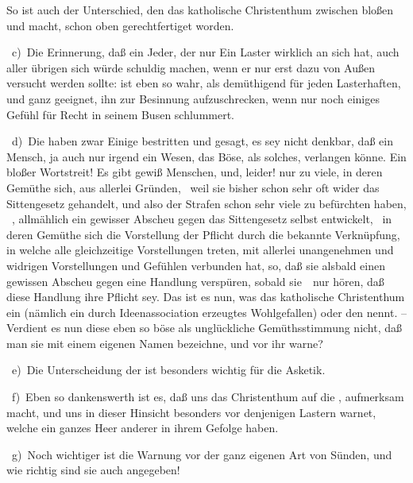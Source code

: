 \begin{aufza}
\item So ist auch der Unterschied, den das katholische Christenthum zwischen bloßen  und  macht, schon oben gerechtfertiget worden.\par
{}~c)~Die Erinnerung, daß ein Jeder, der nur Ein Laster wirklich an sich hat, auch aller übrigen sich würde schuldig machen, wenn er nur erst dazu von Außen versucht werden sollte: ist eben so wahr, als demüthigend für jeden Lasterhaften, und ganz geeignet, ihn zur Besinnung aufzuschrecken, wenn nur noch einiges Gefühl für Recht in seinem Busen schlummert.\par
{}~d)~Die  haben zwar Einige bestritten und gesagt, es sey nicht denkbar, daß ein Mensch, ja auch nur irgend ein Wesen, das Böse, als solches, verlangen könne. Ein bloßer Wortstreit! Es gibt gewiß Menschen, und, leider! nur zu viele, in deren Gemüthe sich, aus allerlei Gründen, \zB\  weil sie bisher schon sehr oft wider das Sittengesetz gehandelt, und also der Strafen schon sehr viele zu befürchten haben, \udgl\ , allmählich ein gewisser Abscheu gegen das Sittengesetz selbst entwickelt, \dh\  in deren Gemüthe sich die Vorstellung der Pflicht durch die bekannte Verknüpfung, in welche alle gleichzeitige Vorstellungen treten, mit allerlei unangenehmen und widrigen Vorstellungen und Gefühlen verbunden hat, so, daß sie alsbald einen gewissen Abscheu gegen eine Handlung verspüren, sobald sie~\ nur hören, daß diese Handlung ihre Pflicht sey. Das ist es nun, was das katholische Christenthum ein  (nämlich ein durch Ideenassociation erzeugtes Wohlgefallen) oder den  nennt. -- Verdient es nun diese eben so böse als unglückliche Gemüthsstimmung nicht, daß man sie mit einem eigenen Namen bezeichne, und vor ihr warne? \par
{}~e)~Die Unterscheidung der  ist besonders wichtig für die Asketik.\par
{}~f)~Eben so dankenswerth ist es, daß uns das Christenthum auf die , aufmerksam macht, und uns in dieser Hinsicht besonders vor denjenigen Lastern warnet, welche ein ganzes Heer anderer in ihrem Gefolge haben.\par
{}~g)~Noch wichtiger ist die Warnung vor der ganz eigenen Art von Sünden,  und wie richtig sind sie auch angegeben!\par

\end{aufza}
